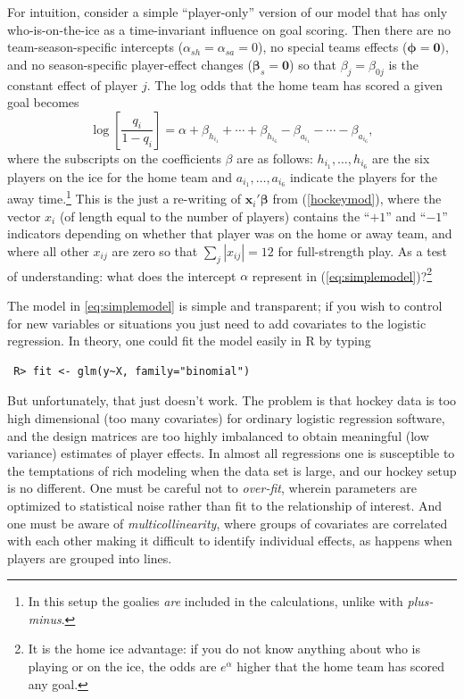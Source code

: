 For intuition, consider a simple ``player-only'' version of our model that has
only who-is-on-the-ice as a time-invariant influence on goal scoring.  Then
there are no team-season-specific intercepts ($\alpha_{sh}=\alpha_{sa}=0$), no
special teams effects ($\boldsymbol{\phi}=\mathbf{0})$, and no season-specific
player-effect changes ($\boldsymbol{\beta}_s = \mathbf{0}$)  so that $\beta_j
= \beta_{0j}$ is the constant effect of player $j$.  The log odds that the
home team has scored a given goal becomes \begin{equation} \log
\left[\frac{q_i}{1-q_i} \right]  = \alpha + \beta_{h_{i_1}} + \cdots +
\beta_{h_{i_6}} -  \beta_{a_{i_1}} - \cdots - \beta_{a_{i_6}},
\label{eq:simplemodel} \end{equation} where the subscripts on the coefficients
$\beta$ are as follows: $h_{i_1}, \dots, h_{i_6}$ are the six players on the
ice for the home team and  $a_{i_1}, \dots, a_{i_6}$ indicate the players for
the away time.\footnote{In this setup the goalies {\em are} included in the
calculations, unlike with {\em plus-minus}.}  This is the just a re-writing of
$\mathbf{x}_i'\boldsymbol{\beta}$ from (\ref{hockeymod}), where the vector
$x_i$ (of length equal to the number of players) contains the ``$+1$'' and
``$-1$'' indicators depending on whether that player was on the home or away
team, and where all other $x_{ij}$ are zero so that $\sum_j |x_{ij}| = 12$ for
full-strength play. As a test of understanding: what does the intercept
$\alpha$ represent in (\ref{eq:simplemodel})?\footnote{It is the home ice
advantage: if you do not know anything about who is playing or on the ice, the
odds are $e^{\alpha}$ higher that the home team has scored any goal.}


The model in \ref{eq:simplemodel} is simple and transparent; if you wish to
control for new variables or situations you just need to add covariates to the
logistic regression. In theory, one could fit the model easily in  {\sf R} by
typing \begin{verbatim} R> fit <- glm(y~X, family="binomial") \end{verbatim}
But unfortunately, that just doesn't work.   The problem is that hockey data
is too high dimensional (too many covariates) for ordinary logistic regression
software, and the design matrices are too highly imbalanced to obtain
meaningful (low variance) estimates of player effects.   In almost all
regressions one is susceptible to the temptations of rich modeling when the
data set is large, and our hockey setup is no different. One must be careful
not to {\em over-fit}, wherein parameters are optimized to statistical noise
rather than fit to the relationship of interest.  And one must be aware of
{\em multicollinearity}, where groups of covariates are correlated with each
other making it difficult to identify individual effects, as happens when
players are grouped into lines.  



